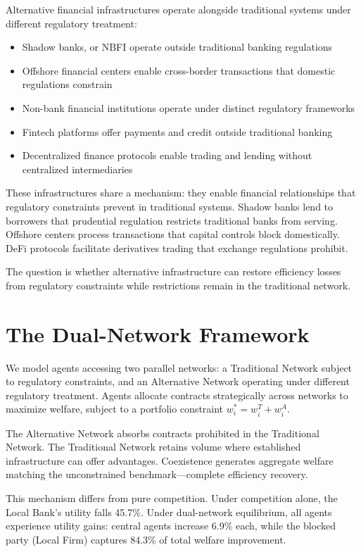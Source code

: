 Alternative financial infrastructures operate alongside traditional systems under different regulatory treatment:

\begin{itemize}
    \item Shadow banks, or NBFI operate outside traditional banking regulations 
    \item Offshore financial centers enable cross-border transactions that domestic regulations constrain
    \item Non-bank financial institutions operate under distinct regulatory frameworks
    \item Fintech platforms offer payments and credit outside traditional banking
    \item Decentralized finance protocols enable trading and lending without centralized intermediaries
\end{itemize}

These infrastructures share a mechanism: they enable financial relationships that regulatory constraints prevent in traditional systems. Shadow banks lend to borrowers that prudential regulation restricts traditional banks from serving. Offshore centers process transactions that capital controls block domestically. DeFi protocols facilitate derivatives trading that exchange regulations prohibit.

The question is whether alternative infrastructure can restore efficiency losses from regulatory constraints while restrictions remain in the traditional network.

\section{The Dual-Network Framework}

We model agents accessing two parallel networks: a Traditional Network subject to regulatory constraints, and an Alternative Network operating under different regulatory treatment. Agents allocate contracts strategically across networks to maximize welfare, subject to a portfolio constraint $w^*_i = w^T_i + w^A_i$.

The Alternative Network absorbs contracts prohibited in the Traditional Network. The Traditional Network retains volume where established infrastructure can offer advantages. Coexistence generates aggregate welfare matching the unconstrained benchmark—complete efficiency recovery.

This mechanism differs from pure competition. Under competition alone, the Local Bank's utility falls 45.7\%. Under dual-network equilibrium, all agents experience utility gains: central agents increase 6.9\% each, while the blocked party (Local Firm) captures 84.3\% of total welfare improvement.

